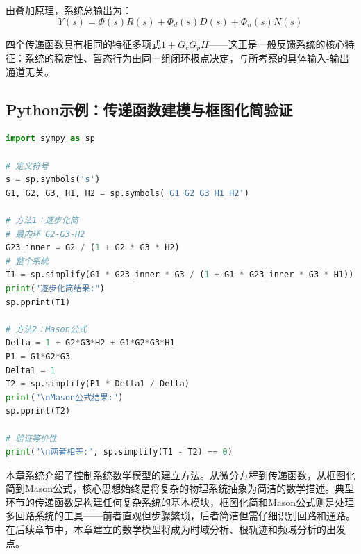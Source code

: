 由叠加原理，系统总输出为：
\[
Y(s) = \Phi(s)R(s) + \Phi_d(s)D(s) + \Phi_n(s)N(s)
\]

\begin{remark}
四个传递函数具有{\heiti 相同的特征多项式}$1+G_cG_pH$——这正是一般反馈系统的核心特征：系统的稳定性、暂态行为由同一组闭环极点决定，与所考察的具体输入-输出通道无关。
\end{remark}

\subsection*{Python示例：传递函数建模与框图化简验证}

\begin{lstlisting}[language=Python]
import sympy as sp

# 定义符号
s = sp.symbols('s')
G1, G2, G3, H1, H2 = sp.symbols('G1 G2 G3 H1 H2')

# 方法1：逐步化简
# 最内环 G2-G3-H2
G23_inner = G2 / (1 + G2 * G3 * H2)
# 整个系统
T1 = sp.simplify(G1 * G23_inner * G3 / (1 + G1 * G23_inner * G3 * H1))
print("逐步化简结果:")
sp.pprint(T1)

# 方法2：Mason公式
Delta = 1 + G2*G3*H2 + G1*G2*G3*H1
P1 = G1*G2*G3
Delta1 = 1
T2 = sp.simplify(P1 * Delta1 / Delta)
print("\nMason公式结果:")
sp.pprint(T2)

# 验证等价性
print("\n两者相等:", sp.simplify(T1 - T2) == 0)
\end{lstlisting}

\begin{remark}
本章系统介绍了控制系统数学模型的建立方法。从微分方程到传递函数，从框图化简到Mason公式，核心思想始终是将复杂的物理系统抽象为简洁的数学描述。典型环节的传递函数是构建任何复杂系统的基本模块，框图化简和Mason公式则是处理多回路系统的工具——前者直观但步骤繁琐，后者简洁但需仔细识别回路和通路。在后续章节中，本章建立的数学模型将成为时域分析、根轨迹和频域分析的出发点。
\end{remark}
